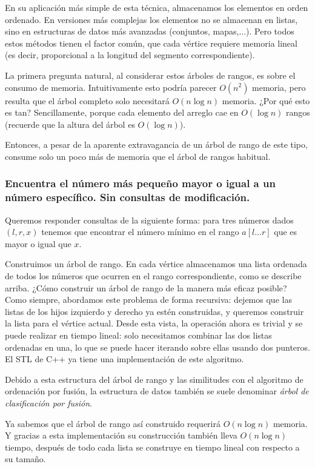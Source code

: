 En su aplicación más simple de esta técnica, almacenamos los elementos en orden ordenado. En versiones más complejas los elementos no se almacenan en listas, sino en estructuras de datos más avanzadas (conjuntos, mapas,...). Pero todos estos métodos tienen el factor común, que cada vértice requiere memoria lineal (es decir, proporcional a la longitud del segmento correspondiente).

La primera pregunta natural, al considerar estos árboles de rangos, es sobre el consumo de memoria. Intuitivamente esto podría parecer $O(n^2)$ memoria, pero resulta que el árbol completo solo necesitará 
$O(n \log n)$ memoria. ¿Por qué esto es tan? Sencillamente, porque cada elemento del arreglo cae en $O(\log n)$ rangos (recuerde que la altura del árbol es $O(\log n)$).

Entonces, a pesar de la aparente extravagancia de un árbol de rango de este tipo, consume solo un poco más de memoria que el árbol de rangos habitual.

\subsubsection{Encuentra el número más pequeño mayor o igual a un número específico. Sin consultas de modificación.}

Queremos responder consultas de la siguiente forma: para tres números dados $(l, r, x)$ tenemos que 
encontrar el número mínimo en el rango $a[l \dots r]$ que es mayor o igual que $x$.

Construimos un árbol de rango. En cada vértice almacenamos una lista ordenada de todos los números que ocurren en el rango correspondiente, como se describe arriba. ¿Cómo construir un árbol de rango de la manera más eficaz posible? Como siempre, abordamos este problema de forma recursiva: dejemos que las listas de los hijos izquierdo y derecho ya estén construidas, y queremos construir la lista para el vértice actual. Desde esta vista, la operación ahora es trivial y se puede realizar en tiempo lineal: solo necesitamos combinar las dos listas ordenadas en una, lo que se puede hacer iterando sobre ellas usando dos punteros. El STL de C++ ya tiene una implementación de este algoritmo.

Debido a esta estructura del árbol de rango y las similitudes con el algoritmo de ordenación por fusión, la estructura de datos también se suele denominar \emph{árbol de clasificación por fusión}.

Ya sabemos que el árbol de rango así construido requerirá $O(n \log n)$ memoria. Y gracias a esta implementación su construcción también lleva $O(n \log n)$ tiempo, después de todo cada lista se construye en tiempo lineal con respecto a su tamaño.

